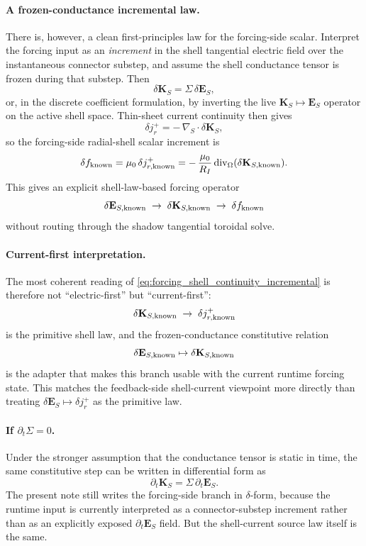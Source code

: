 \documentclass[11pt,a4paper]{article}
\begin{document}
\paragraph{A frozen-conductance incremental law.}
There is, however, a clean first-principles law for the forcing-side scalar.
Interpret the forcing input as an \emph{increment} in the shell tangential
electric field over the instantaneous connector substep, and assume the shell
conductance tensor is frozen during that substep. Then
\[
\delta \mathbf K_S = \Sigma\,\delta \mathbf E_S,
\]
or, in the discrete coefficient formulation, by inverting the live
\(\mathbf K_S \mapsto \mathbf E_S\) operator on the active shell space.
Thin-sheet current continuity then gives
\[
\delta j_r^+
=
-\,\nabla_S\cdot \delta \mathbf K_S,
\]
so the forcing-side radial-shell scalar increment is
\begin{equation}
\delta f_{\rm known}
=
\mu_0\,\delta j_{r,\rm known}^+
=
-\,\frac{\mu_0}{R_I}\,\mathrm{div}_\Omega(\delta \mathbf K_{S,\rm known}).
\label{eq:forcing_shell_continuity_incremental}
\end{equation}
This gives an explicit shell-law-based forcing operator
\[
\delta\mathbf E_{S,\rm known}
\;\to\;
\delta\mathbf K_{S,\rm known}
\;\to\;
\delta f_{\rm known}
\]
without routing through the shadow tangential toroidal solve.

\paragraph{Current-first interpretation.}
The most coherent reading of \eqref{eq:forcing_shell_continuity_incremental}
is therefore not ``electric-first'' but ``current-first'':
\[
\delta\mathbf K_{S,\rm known}
\;\to\;
\delta j_{r,\rm known}^+
\]
is the primitive shell law, and the frozen-conductance constitutive relation
\[
\delta\mathbf E_{S,\rm known}\mapsto \delta\mathbf K_{S,\rm known}
\]
is the adapter that makes this branch usable with the current runtime forcing
state. This matches the feedback-side shell-current viewpoint more directly
than treating \(\delta\mathbf E_S\mapsto \delta j_r^+\) as the primitive law.

\paragraph{If \(\partial_t\Sigma=0\).}
Under the stronger assumption that the conductance tensor is static in time,
the same constitutive step can be written in differential form as
\[
\partial_t \mathbf K_S = \Sigma\,\partial_t \mathbf E_S.
\]
The present note still writes the forcing-side branch in \(\delta\)-form,
because the runtime input is currently interpreted as a connector-substep
increment rather than as an explicitly exposed \(\partial_t \mathbf E_S\)
field. But the shell-current source law itself is the same.
\end{document}
